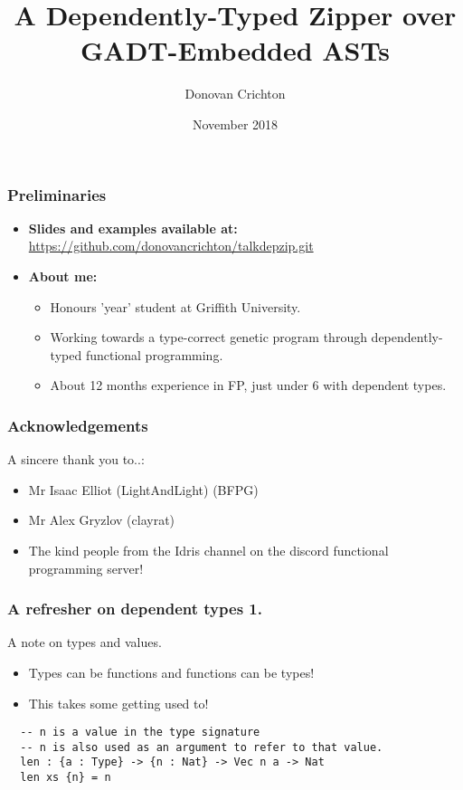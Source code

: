\documentclass{beamer}
\title{A Dependently-Typed Zipper over GADT-Embedded ASTs}
\author{Donovan Crichton}
\date{November 2018}
\begin{document}
 
\frame{\titlepage}

\begin{frame}[fragile]
  \frametitle{Preliminaries}
  \begin{itemize}
    \item \textbf{Slides and examples available at:}
    \url{https://github.com/donovancrichton/talkdepzip.git}
  \item \textbf{About me:}
    \begin{itemize}
      \item Honours 'year' student at Griffith University.
      \item Working towards a type-correct genetic program through
              dependently-typed functional programming.
      \item About 12 months experience in FP, just under 6 with
              dependent types.
    \end{itemize}
  \end{itemize}
\end{frame}

\begin{frame}[fragile]
  \frametitle{Acknowledgements}
  \begin{block}{A sincere thank you to..:}
    \begin{itemize}
      \item Mr Isaac Elliot (LightAndLight) (BFPG)
      \item Mr Alex Gryzlov (clayrat)
      \item The kind people from the Idris channel 
        on the discord functional programming server!
    \end{itemize}
  \end{block}
\end{frame}

\begin{frame}[fragile]
  \frametitle{A refresher on dependent types 1.}
  \begin{block}{A note on types and values.}
    \begin{itemize}
    \item Types can be functions and functions can be types!
    \item This takes some getting used to!
    \end{itemize}
  \end{block}
  \begin{verbatim}
  -- n is a value in the type signature
  -- n is also used as an argument to refer to that value.
  len : {a : Type} -> {n : Nat} -> Vec n a -> Nat
  len xs {n} = n
  \end{verbatim}
\end{frame}
\end{document}
